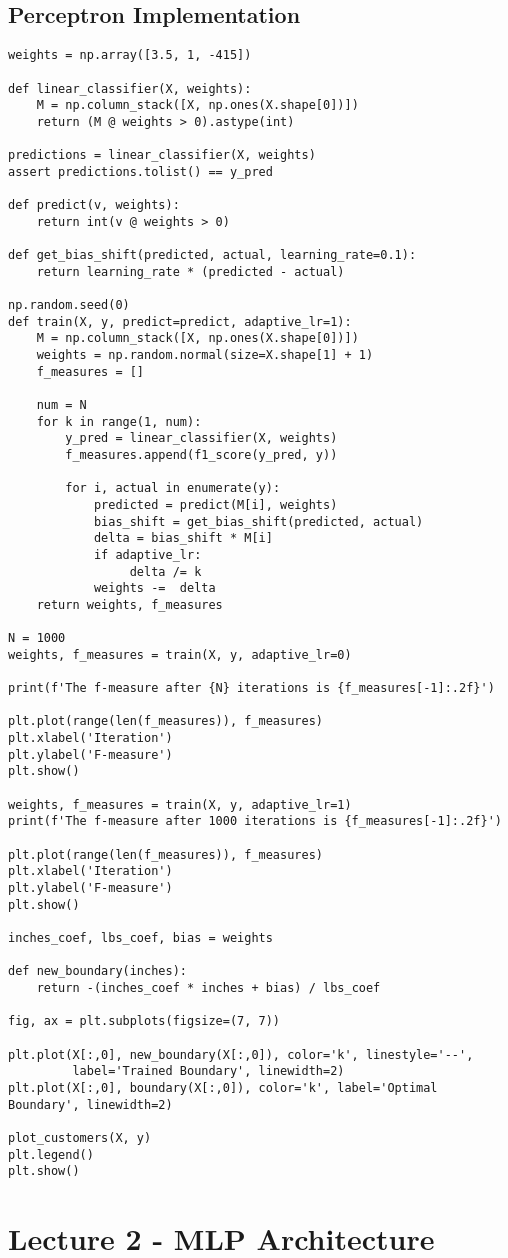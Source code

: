 \documentclass[article]{llncs}
\begin{document}
\subsection{Perceptron Implementation}
\begin{verbatim}
weights = np.array([3.5, 1, -415])

def linear_classifier(X, weights):
    M = np.column_stack([X, np.ones(X.shape[0])])
    return (M @ weights > 0).astype(int)

predictions = linear_classifier(X, weights)
assert predictions.tolist() == y_pred

def predict(v, weights): 
    return int(v @ weights > 0)

def get_bias_shift(predicted, actual, learning_rate=0.1): 
    return learning_rate * (predicted - actual)

np.random.seed(0)
def train(X, y, predict=predict, adaptive_lr=1):
    M = np.column_stack([X, np.ones(X.shape[0])])
    weights = np.random.normal(size=X.shape[1] + 1)
    f_measures = []
    
    num = N
    for k in range(1, num):
        y_pred = linear_classifier(X, weights)
        f_measures.append(f1_score(y_pred, y))
        
        for i, actual in enumerate(y):
            predicted = predict(M[i], weights)
            bias_shift = get_bias_shift(predicted, actual)
            delta = bias_shift * M[i]
            if adaptive_lr:
                 delta /= k
            weights -=  delta 
    return weights, f_measures

N = 1000
weights, f_measures = train(X, y, adaptive_lr=0)

print(f'The f-measure after {N} iterations is {f_measures[-1]:.2f}')

plt.plot(range(len(f_measures)), f_measures)
plt.xlabel('Iteration')
plt.ylabel('F-measure')
plt.show()

weights, f_measures = train(X, y, adaptive_lr=1)
print(f'The f-measure after 1000 iterations is {f_measures[-1]:.2f}') 

plt.plot(range(len(f_measures)), f_measures)
plt.xlabel('Iteration')
plt.ylabel('F-measure')
plt.show()

inches_coef, lbs_coef, bias = weights

def new_boundary(inches):
    return -(inches_coef * inches + bias) / lbs_coef

fig, ax = plt.subplots(figsize=(7, 7))

plt.plot(X[:,0], new_boundary(X[:,0]), color='k', linestyle='--',
         label='Trained Boundary', linewidth=2)
plt.plot(X[:,0], boundary(X[:,0]), color='k', label='Optimal Boundary', linewidth=2)

plot_customers(X, y)
plt.legend()
plt.show()
\end{verbatim}

\section{Lecture 2 - MLP Architecture}
\end{document}

